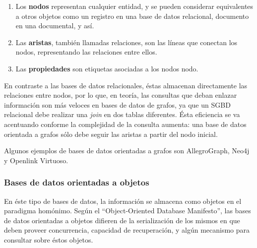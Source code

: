 \begin{enumerate}
\item Los \textbf{nodos} representan cualquier entidad, y se pueden considerar
  equivalentes a otros objetos como un registro en una base de datos relacional,
  documento en una documental, y así.
 \item Las \textbf{aristas}, también llamadas relaciones, son las líneas que
   conectan los nodos, representando las relaciones entre ellos.
 \item Las \textbf{propiedades} son etiquetas asociadas a los nodos
   nodo.
\end{enumerate}

En contraste a las bases de datos relacionales, éstas almacenan directamente las
relaciones entre nodos, por lo que, en teoría, las consultas que deban enlazar información
son más veloces en bases de datos de grafos, ya que un SGBD relacional debe
realizar una \emph{join} en dos tablas diferentes. Ésta eficiencia se va
acentuando conforme la complejidad de la consulta aumenta: una base de datos
orientada a grafos sólo debe seguir las aristas a partir del nodo inicial.

Algunos ejemplos de bases de datos orientadas a grafos son AllegroGraph, Neo4j y
Openlink Virtuoso.

\subsubsection{Bases de datos orientadas a objetos}
\label{subsubsec:state_NoSQL_types_object}

En éste tipo de bases de datos, la información se almacena como objetos en el
paradigma homónimo. Según el ``Object-Oriented Database Manifesto'', las bases
de datos orientadas a objetos difieren de la serialización de los mismos en que
deben proveer concurrencia, capacidad de recuperación, y algún mecanismo para
consultar sobre éstos objetos.